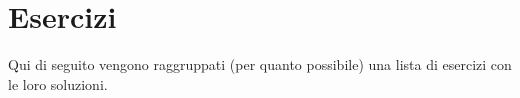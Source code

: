 \chapter{Esercizi}

Qui di seguito vengono raggruppati (per quanto possibile) una lista di esercizi
con le loro soluzioni.
